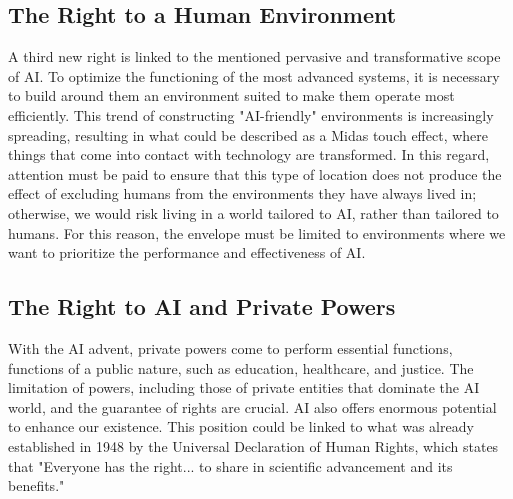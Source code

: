 \subsection{The Right to a Human Environment}
A third new right is linked to the mentioned pervasive and transformative scope of AI. To optimize the functioning of the most advanced systems, it is necessary to build around them an environment suited to make them operate most efficiently. This trend of constructing "AI-friendly" environments is increasingly spreading, resulting in what could be described as a Midas touch effect, where things that come into contact with technology are transformed. In this regard, attention must be paid to ensure that this type of location does not produce the effect of excluding humans from the environments they have always lived in; otherwise, we would risk living in a world tailored to AI, rather than tailored to humans. For this reason, the envelope must be limited to environments where we want to prioritize the performance and effectiveness of AI.

\subsection{The Right to AI and Private Powers}
With the AI advent, private powers come to perform essential functions, functions of a public nature, such as education, healthcare, and justice. The limitation of powers, including those of private entities that dominate the AI world, and the guarantee of rights are crucial. AI also offers enormous potential to enhance our existence. This position could be linked to what was already established in 1948 by the Universal Declaration of Human Rights, which states that "Everyone has the right... to share in scientific advancement and its benefits."
